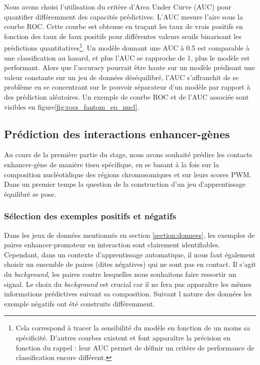 \documentclass[french]{llncs}
\begin{document}
Nous avons choisi l'utilisation du critère d'Area Under Curve (AUC) pour quantifier différemment des capacités prédictives. L'AUC mesure l'aire sous la courbe ROC. Cette courbe est obtenue en traçant les taux de vrais positifs en fonction des taux de faux positifs pour différentes valeurs seuils binarisant les prédictions quantitatives\footnote{Cela correspond à tracer la sensibilité du modèle en fonction de un moins sa spécificité. D'autres courbes existent et font apparaître la précision en fonction du rappel : leur AUC permet de définir un critère de performance de classification encore différent.}. Un modèle donnant une AUC à 0.5 est comparable à une classification au hasard, et plus l'AUC se rapproche de 1, plus le modèle est performant.
Alors que l'accuracy pourrait être haute sur un modèle prédisant une valeur constante sur un jeu de données déséquilibré, l'AUC s'affranchit de se problème en se concentrant sur le pouvoir séparateur d'un modèle par rapport à des prédiction aléatoires. Un exemple de courbe ROC et de l'AUC associée sont visibles en figure\ref{fig:rocs_fantom_ep_nucl}.

\subsection{Prédiction des interactions enhancer-gènes}\label{section:methdoes_ep}

Au cours de la première partie du stage, nous avons souhaité prédire les contacts enhancer-gène de manière tissu spécifique, en se basant à la fois sur la composition nucléotidique des régions chromosomiques et sur leurs scores PWM. Dans un premier temps la question de la construction d'un jeu d'apprentissage équilibré se pose.

\subsubsection{Sélection des exemples positifs et négatifs} \label{section:chia-pet}

Dans les jeux de données mentionnés en section \ref{section:donnees}, les exemples de paires enhancer-promoteur en interaction sont clairement identifiables. Cependant, dans un contexte d'apprentissage automatique, il nous faut également choisir un ensemble de paires (dites négatives) qui ne sont pas en contact. Il s'agit du \textit{background}, les paires contre lesquelles nous souhaitons faire ressortir un signal. Le choix du \textit{background} est crucial car il ne fera pas apparaître les mêmes informations prédictives suivant sa composition. Suivant l nature des données les exemple négatifs ont été construits différemment.
\end{document}
